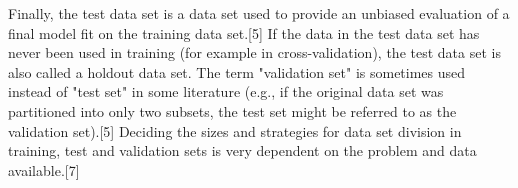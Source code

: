 Finally, the test data set is a data set used to provide an unbiased evaluation of a final model fit on the training data set.[5] If the data in the test data set has never been used in training (for example in cross-validation), the test data set is also called a holdout data set. The term "validation set" is sometimes used instead of "test set" in some literature (e.g., if the original data set was partitioned into only two subsets, the test set might be referred to as the validation set).[5]
Deciding the sizes and strategies for data set division in training, test and validation sets is very dependent on the problem and data available.[7]




